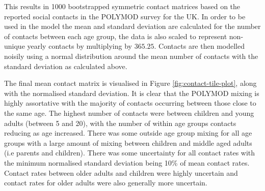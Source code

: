 \documentclass[11pt,twoside]{bristolthesis}
\begin{document}
  This results in 1000 bootstrapped symmetric contact matrices based on the reported social contacts in the POLYMOD survey for the UK. In order to be used in the model the mean and standard deviation are calculated for the number of contacts between each age group, the data is also scaled to represent non-unique yearly contacts by multiplying by \(365.25\). Contacts are then modelled noisily using a normal distribution around the mean number of contacts with the standard deviation as calculated above.
  
  The final mean contact matrix is visualised in Figure \ref{fig:contact-tile-plot}, along with the normalised standard deviation. It is clear that the POLYMOD mixing is highly assortative with the majority of contacts occurring between those close to the same age. The highest number of contacts were between children and young adults (between 5 and 20), with the number of within age groups contacts reducing as age increased. There was some outside age group mixing for all age groups with a large amount of mixing between children and middle aged adults (i.e parents and children). There was some uncertainty for all contact rates with the minimum normalised standard deviation being 10\% of mean contact rates. Contact rates between older adults and children were highly uncertain and contact rates for older adults were also generally more uncertain.
\end{document}

